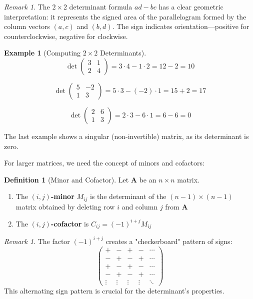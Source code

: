\documentclass[12pt]{article}
\numberwithin{equation}{section}
\newcommand{\mat}[1]{\mathbf{#1}}        %
\theoremstyle{plain}
\theoremstyle{definition}
\newtheorem{definition}[theorem]{Definition}
\newtheorem{example}[theorem]{Example}
\theoremstyle{remark}
\newtheorem{remark}[theorem]{Remark}
\begin{document}
\begin{remark}
The $2 \times 2$ determinant formula $ad - bc$ has a clear geometric interpretation: it represents the signed area of the parallelogram formed by the column vectors $(a,c)$ and $(b,d)$. The sign indicates orientation—positive for counterclockwise, negative for clockwise.
\end{remark}

\begin{example}[Computing $2 \times 2$ Determinants]
$$\det\begin{pmatrix} 3 & 1 \\ 2 & 4 \end{pmatrix} = 3 \cdot 4 - 1 \cdot 2 = 12 - 2 = 10$$

$$\det\begin{pmatrix} 5 & -2 \\ 1 & 3 \end{pmatrix} = 5 \cdot 3 - (-2) \cdot 1 = 15 + 2 = 17$$

$$\det\begin{pmatrix} 2 & 6 \\ 1 & 3 \end{pmatrix} = 2 \cdot 3 - 6 \cdot 1 = 6 - 6 = 0$$

The last example shows a singular (non-invertible) matrix, as its determinant is zero.
\end{example}

For larger matrices, we need the concept of minors and cofactors:

\begin{definition}[Minor and Cofactor]
Let $\mat{A}$ be an $n \times n$ matrix.
\begin{enumerate}
\item The \textbf{$(i,j)$-minor} $M_{ij}$ is the determinant of the $(n-1) \times (n-1)$ matrix obtained by deleting row $i$ and column $j$ from $\mat{A}$
\item The \textbf{$(i,j)$-cofactor} is $C_{ij} = (-1)^{i+j}M_{ij}$
\end{enumerate}
\end{definition}

\begin{remark}
The factor $(-1)^{i+j}$ creates a "checkerboard" pattern of signs:
$$\begin{pmatrix}
+ & - & + & - & \cdots\\
- & + & - & + & \cdots\\
+ & - & + & - & \cdots\\
- & + & - & + & \cdots\\
\vdots & \vdots & \vdots & \vdots & \ddots
\end{pmatrix}$$
This alternating sign pattern is crucial for the determinant's properties.
\end{remark}
\end{document}
